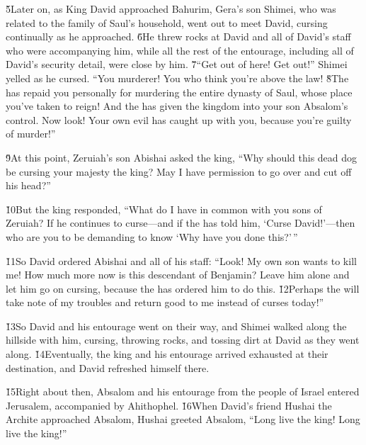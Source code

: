 \v{5}Later on, as King David approached Bahurim, Gera's son Shimei, who was related to the family of Saul's household, went out to meet David, cursing continually as he approached. \v{6}He threw rocks at David and all of David's staff who were accompanying him, while all the rest of the entourage, including all of David's security detail, were close by him. \v{7}``Get out of here! Get out!'' Shimei yelled as he cursed. ``You murderer! You who think you're above the law! \v{8}The  has repaid you personally for murdering the entire dynasty of Saul, whose place you've taken to reign! And the  has given the kingdom into your son Absalom's control. Now look! Your own evil has caught up with you, because you're guilty of murder!''

\v{9}At this point, Zeruiah's son Abishai asked the king, ``Why should this dead dog be cursing your majesty the king? May I have permission to go over and cut off his head?''

\v{10}But the king responded, ``What do I have in common with you sons of Zeruiah? If he continues to curse---and if the  has told him, `Curse David!'---then who are you to be demanding to know `Why have you done this?'\,''

\v{11}So David ordered Abishai and all of his staff: ``Look! My own son wants to kill me! How much more now is this descendant of Benjamin? Leave him alone and let him go on cursing, because the  has ordered him to do this. \v{12}Perhaps the  will take note of my troubles and return good to me instead of curses today!''

\v{13}So David and his entourage went on their way, and Shimei walked along the hillside with him, cursing, throwing rocks, and tossing dirt at David as they went along. \v{14}Eventually, the king and his entourage arrived exhausted at their destination, and David refreshed himself there.

\v{15}Right about then, Absalom and his entourage from the people of Israel entered Jerusalem, accompanied by Ahithophel. \v{16}When David's friend Hushai the Archite approached Absalom, Hushai greeted Absalom, ``Long live the king! Long live the king!''

